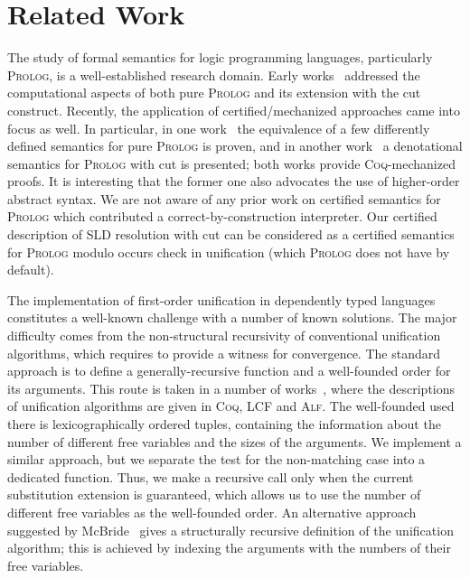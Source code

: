 \section{Related Work}

The study of formal semantics for logic programming languages, particularly \textsc{Prolog}, is a well-established research domain. Early
works~\cite{JonesMycroftSemantics,DebrayMishraSemantics} addressed the computational aspects of both pure \textsc{Prolog} and its extension
with the cut construct. Recently, the application of certified/mechanized approaches came into focus as well. In particular,
in one work~\cite{CertifiedPrologEquivalences} the equivalence of a few differently defined semantics
for pure \textsc{Prolog} is proven, and in another work~\cite{CeritfiedDenotationalCut} a denotational semantics for \textsc{Prolog} with cut is presented; both
works provide \textsc{Coq}-mechanized proofs. It is interesting that the former one also advocates the use of higher-order
abstract syntax. We are not aware of any prior work on certified semantics for \textsc{Prolog} which contributed a correct-by-construction
interpreter. Our certified description of SLD resolution with cut can be considered as a certified semantics for \textsc{Prolog} modulo
occurs check in unification (which \textsc{Prolog} does not have by default).

The implementation of first-order unification in dependently typed languages constitutes a well-known challenge with a number of
known solutions. The major difficulty comes from the non-structural recursivity of conventional unification algorithms, which
requires to provide a witness for convergence. The standard approach is to define a generally-recursive function and a well-founded order
for its arguments. This route is taken in a number of works~\cite{MGUinLCF,MGUinMLTT,IdempMGUinCoq,TextbookMGUinCoq}, where the descriptions of
unification algorithms are given in \textsc{Coq}, \textsc{LCF} and \textsc{Alf}. The well-founded used there is
lexicographically ordered tuples, containing the information about the number of different free variables and the sizes of
the arguments. We implement a similar approach, but we separate the test for the non-matching case into a dedicated
function. Thus, we make a recursive call only when the current substitution extension is guaranteed, which allows us to use the
number of different free variables as the well-founded order. An alternative approach suggested by McBride~\cite{StructuralMGU} gives a structurally recursive definition of
the unification algorithm; this is achieved by indexing the arguments with the numbers of their free variables.

